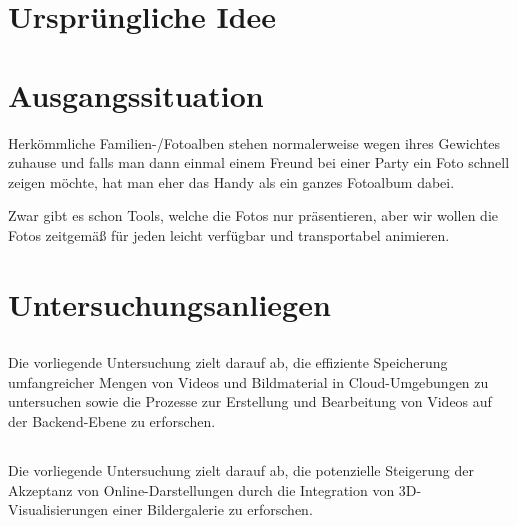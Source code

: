 
\section{Ursprüngliche Idee}

\section{Ausgangssituation}

Herkömmliche Familien-/Fotoalben stehen normalerweise wegen ihres Gewichtes 
zuhause und falls man dann einmal einem Freund bei einer Party ein Foto schnell 
zeigen möchte, hat man eher das Handy als ein ganzes Fotoalbum dabei.

Zwar gibt es schon Tools, welche die Fotos nur präsentieren, 
aber wir wollen die Fotos zeitgemä\ss{} für jeden leicht verfügbar und transportabel animieren.

\section{Untersuchungsanliegen}

\subsection{\firstauthor}

Die vorliegende Untersuchung zielt darauf ab, die effiziente Speicherung 
umfangreicher Mengen von Videos und Bildmaterial in Cloud-Umgebungen zu 
untersuchen sowie die Prozesse zur Erstellung und Bearbeitung von Videos 
auf der Backend-Ebene zu erforschen.

\subsection{\secondauthor}

Die vorliegende Untersuchung zielt darauf ab, die potenzielle Steigerung 
der Akzeptanz von Online-Darstellungen durch die Integration von 
3D-Visualisierungen einer Bildergalerie zu erforschen.

